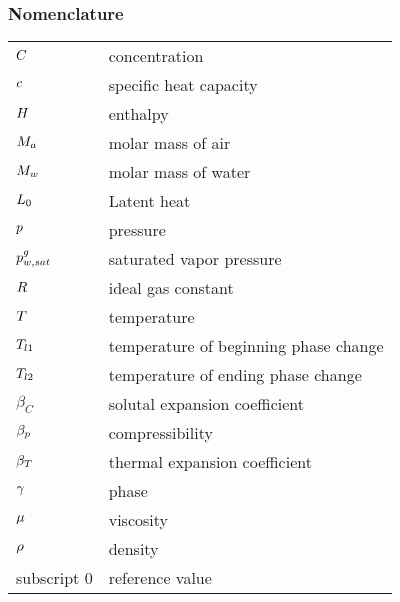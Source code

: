 \subsubsection*{Nomenclature}
\begin{tabular}{ll}
$C$ & concentration\\
$c $ & specific heat capacity\\
$H$ & enthalpy\\
$M_a$ & molar mass of air\\
$M_w$ & molar mass of water\\
$L_0$ & Latent heat\\
$p$ & pressure\\
$p^g_{w,sat}$ & saturated vapor pressure\\
$R$ & ideal gas constant\\
$T$ & temperature\\
$T_{l1}$ & temperature of beginning phase change\\
$T_{l2}$ & temperature of ending phase change\\
$\beta_C$ & solutal expansion coefficient\\
$\beta_p$ & compressibility\\
$\beta_T$ & thermal expansion coefficient\\
$\gamma$ & phase\\
$\mu$ & viscosity\\
$\rho$ & density\\
subscript 0 &  reference value\\
\end{tabular}




